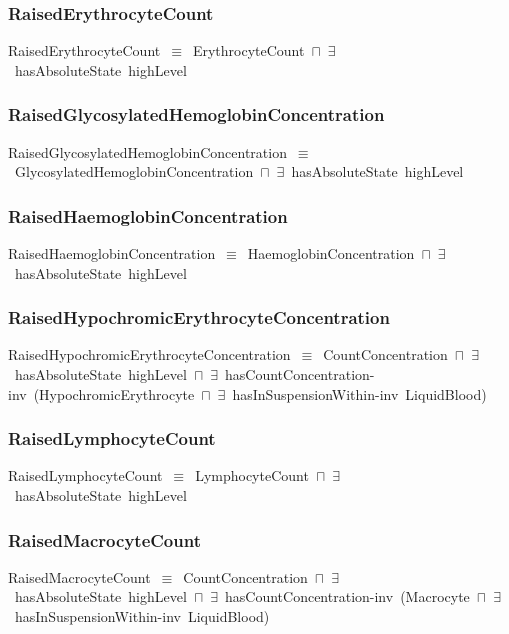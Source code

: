 \documentclass{article}
\begin{document}
\subsubsection*{RaisedErythrocyteCount}

RaisedErythrocyteCount~\ensuremath{\equiv}~ErythrocyteCount~\ensuremath{\sqcap}~\ensuremath{\exists}~hasAbsoluteState~highLevel

\subsubsection*{RaisedGlycosylatedHemoglobinConcentration}

RaisedGlycosylatedHemoglobinConcentration~\ensuremath{\equiv}~GlycosylatedHemoglobinConcentration~\ensuremath{\sqcap}~\ensuremath{\exists}~hasAbsoluteState~highLevel

\subsubsection*{RaisedHaemoglobinConcentration}

RaisedHaemoglobinConcentration~\ensuremath{\equiv}~HaemoglobinConcentration~\ensuremath{\sqcap}~\ensuremath{\exists}~hasAbsoluteState~highLevel

\subsubsection*{RaisedHypochromicErythrocyteConcentration}

RaisedHypochromicErythrocyteConcentration~\ensuremath{\equiv}~CountConcentration~\ensuremath{\sqcap}~\ensuremath{\exists}~hasAbsoluteState~highLevel~\ensuremath{\sqcap}~\ensuremath{\exists}~hasCountConcentration-inv~(HypochromicErythrocyte~\ensuremath{\sqcap}~\ensuremath{\exists}~hasInSuspensionWithin-inv~LiquidBlood)

\subsubsection*{RaisedLymphocyteCount}

RaisedLymphocyteCount~\ensuremath{\equiv}~LymphocyteCount~\ensuremath{\sqcap}~\ensuremath{\exists}~hasAbsoluteState~highLevel

\subsubsection*{RaisedMacrocyteCount}

RaisedMacrocyteCount~\ensuremath{\equiv}~CountConcentration~\ensuremath{\sqcap}~\ensuremath{\exists}~hasAbsoluteState~highLevel~\ensuremath{\sqcap}~\ensuremath{\exists}~hasCountConcentration-inv~(Macrocyte~\ensuremath{\sqcap}~\ensuremath{\exists}~hasInSuspensionWithin-inv~LiquidBlood)
\end{document}
